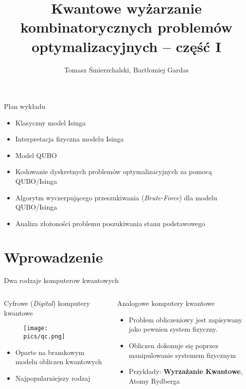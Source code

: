 \documentclass[11pt, xcolor={dvipsnames,svgnames},aspectratio=169]{beamer}
\author{Tomasz Śmierzchalski, Bartłomiej Gardas}
\title[klasyczne modele QUBO i Isinga]{Kwantowe wyżarzanie kombinatorycznych problemów optymalizacyjnych – część I}
\institute[IITIS]{Instytut Informatyki Teoretycznej i Stosowanej Polskiej Akademii Nauk}
\date{}
\begin{document}
	\frame{\maketitle}
	\theoremstyle{plain}
	
	\begin{frame}{Plan wykładu}
		\begin{itemize}
			\item Klasyczny model Isinga
			\item Interpretacja fizyczna modelu Isinga
			\item Model QUBO
			\item Kodowanie dyskretnych problemów optymalizacyjnych za pomocą QUBO/Isinga
			\item Algorytm wyczerpującego przeszukiwania (\textit{Brute-Force}) dla modelu QUBO/Isinga
			\item Analiza złożoności problemu poszukiwania stanu podstawowego
		\end{itemize}
	\end{frame}
	
	\section{Wprowadzenie}
	
	\begin{frame}
		\centering
		Dwa rodzaje komputerow kwantowych
		  \begin{columns}[T]
		  	\begin{column}{.48\textwidth}
		  		\centering
		  		Cyfrowe (\textit{Digital}) komputery kwantowe
		  		\begin{figure}
		  		\centering
		  		\texttt{[image: pics/qc.png]}
		  		\end{figure}
		  		\begin{itemize}
		  			\item Oparte na bramkowym modelu obliczen kwantowych
		  			\item Najpopularniejszy rodzaj
		  		\end{itemize}
		  	\end{column}
		  	\begin{column}{.48\textwidth}
		  		\centering
		  		Analogowe komputery kwantowe
		  		\begin{itemize}
		  			\item Problem obliczeniowy jest zapisywany jako pewnien system fizyczny. 
		  			\item Obliczen dokonuje się poprzez manipulowanie systemem fizycznym
		  			\item Przykłady: \textbf{Wyrzażanie Kwantowe}, Atomy Rydberga
		  		\end{itemize}
		  	\end{column}
		  \end{columns}
	\end{frame}
	
\end{document}
